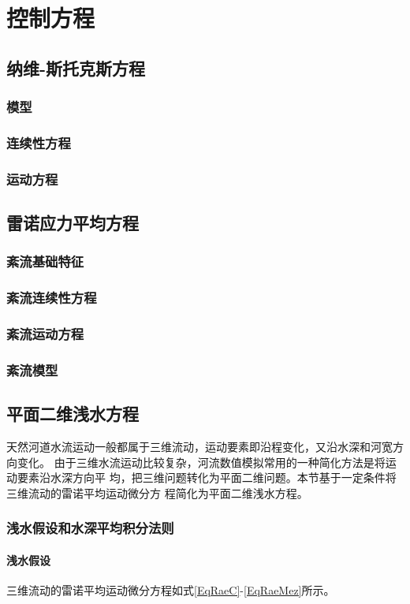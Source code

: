 \chapter{控制方程}
\section{纳维-斯托克斯方程}
\subsection{模型}
\subsection{连续性方程}
\subsection{运动方程}
\section{雷诺应力平均方程}
\subsection{紊流基础特征}
\subsection{紊流连续性方程}
\subsection{紊流运动方程}
\subsection{紊流模型}
\section{平面二维浅水方程}
天然河道水流运动一般都属于三维流动，运动要素即沿程变化，又沿水深和河宽方向变化。
由于三维水流运动比较复杂，河流数值模拟常用的一种简化方法是将运动要素沿水深方向平
均，把三维问题转化为平面二维问题。本节基于一定条件将三维流动的雷诺平均运动微分方
程简化为平面二维浅水方程。
\subsection{浅水假设和水深平均积分法则}
\subsubsection{浅水假设}
三维流动的雷诺平均运动微分方程如式\eqref{EqRaeC}-\eqref{EqRaeMez}所示。

